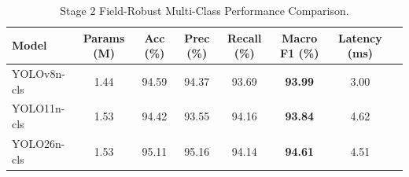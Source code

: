 \begin{table}[htbp]
\centering
\caption{Stage 2 Field-Robust Multi-Class Performance Comparison.}
\label{tab:stage2_robust_cls_benchmark}
\begin{tabular}{lccccccc}
\toprule
\textbf{Model} & \textbf{Params (M)} & \textbf{Acc (\%)} & \textbf{Prec (\%)} & \textbf{Recall (\%)} & \textbf{Macro F1 (\%)} & \textbf{Latency (ms)} \\
\midrule
YOLOv8n-cls & 1.44 & 94.59 & 94.37 & 93.69 & \textbf{93.99} & 3.00 \\
YOLO11n-cls & 1.53 & 94.42 & 93.55 & 94.16 & \textbf{93.84} & 4.62 \\
YOLO26n-cls & 1.53 & 95.11 & 95.16 & 94.14 & \textbf{94.61} & 4.51 \\
\bottomrule
\end{tabular}
\end{table}
